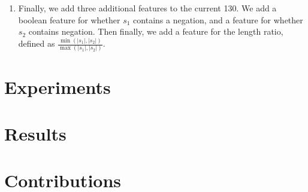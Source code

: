 \documentclass[11pt, reqno]{amsart}
\begin{document}
\begin{enumerate}
	\item Finally, we add three additional features to the current 130. We add a boolean feature for whether $s_1$ contains a negation, and a feature for whether $s_2$ contains negation. Then finally, we add a feature for the length ratio, defined as $\frac{\min(|s_1|, |s_2|)}{\max(|s_1|, |s_2|)}$.
	\end{enumerate}
	
	\section{Experiments}
	
	\section{Results}
	

	
	\section{Contributions}
	
	
	
		
\end{document}
